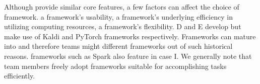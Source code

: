 Although \DIFdelbegin {}\DIFdelend \DIFaddbegin {}\DIFaddend provide similar core features, a few factors can affect the choice of framework. \DIFdelbegin {}\DIFdelend \DIFaddbegin {}\DIFaddend a framework's usability, \DIFdelbegin {}\DIFdelend \DIFaddbegin {}\DIFaddend a framework's underlying efficiency in utilizing computing resources, \DIFdelbegin {}\DIFdelend \DIFaddbegin {}\DIFaddend a framework's flexibility. \DIFdelbegin {}\DIFdelend \DIFaddbegin {}\DIFaddend D and E develop \DIFdelbegin {}\DIFdelend \DIFaddbegin {}\DIFaddend but make use of Kaldi and PyTorch frameworks respectively. %
Frameworks can mature into \DIFdelbegin {}\DIFdelend \DIFaddbegin {}\DIFaddend and therefore teams might \DIFdelbegin {}\DIFdelend \DIFaddbegin {}\DIFaddend different frameworks out of such historical reasons. %
\DIFdelbegin {}\DIFdelend \DIFaddbegin {}\DIFaddend frameworks such as Spark \DIFdelbegin {}\DIFdelend also feature in case I. We generally note that team members freely adopt frameworks suitable for accomplishing tasks efficiently. %


